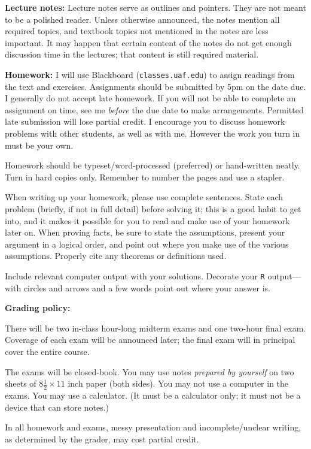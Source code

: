 \documentclass{article}
\begin{document}
\bigskip
\textbf{\large Lecture notes:}
Lecture notes serve as outlines and pointers.
They are not meant to be a polished reader.
Unless otherwise announced,
the notes mention all required topics,
and textbook topics not mentioned in the notes are less important.
It may happen that certain content of the notes
do not get enough discussion time in the lectures;
that content is still required material.

\bigskip
\textbf{\large Homework:}
I will use Blackboard (\texttt{classes.uaf.edu}) to assign readings from
the text and exercises.
Assignments should be submitted by 5pm on the date due.
I generally do not accept late homework.
If you will not be able to complete an assignment on time,
see me \emph{before} the due date to make arrangements.
Permitted late submission will lose partial credit.
I encourage you to discuss homework problems with other students,
as well as with me.
However the work you turn in must be your own.

Homework should be typeset/word-processed (preferred) or hand-written neatly.
Turn in hard copies only. Remember to number the pages and use a stapler.

When writing up your homework, please use complete sentences.
State each problem (briefly, if not in full detail) before solving it;
this is a good habit to get into,
and it makes it possible for you to read and make use of your homework
later on. When proving facts, be sure to state the assumptions, present
your argument in a logical order, and point out where you make use of
the various assumptions.
Properly cite any theorems or definitions used.

Include relevant computer output with your solutions.
Decorate your \texttt{R} output---with circles and arrows and a few
words point out where your answer is.


\bigskip
\textbf{\large Grading policy:}

There will be two in-class hour-long midterm exams
and one two-hour final exam.
Coverage of each exam will be announced later;
the final exam will in principal cover the entire course.

The exams will be closed-book. You may use notes \emph{prepared by
yourself} on two sheets of $8 \frac{1}{2} \times 11$ inch paper (both sides).
You may not use a computer in the exams.
You may use a calculator.
(It must be a calculator only; it must not be a device that can store
notes.)

In all homework and exams,
messy presentation and incomplete/unclear writing, as determined by the
grader, may cost partial credit.
\end{document}
